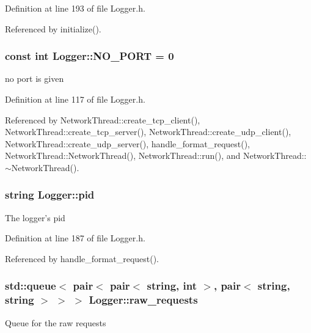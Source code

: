 Definition at line 193 of file Logger.h.



Referenced by initialize().

\hypertarget{classLogger_a5ec2e368c2190d33a096925d96309b32}{
\subsubsection[{NO\_\-PORT}]{\setlength{\rightskip}{0pt plus 5cm}const int {\bf Logger::NO\_\-PORT} = 0}}
\label{classLogger_a5ec2e368c2190d33a096925d96309b32}
no port is given 

Definition at line 117 of file Logger.h.



Referenced by NetworkThread::create\_\-tcp\_\-client(), NetworkThread::create\_\-tcp\_\-server(), NetworkThread::create\_\-udp\_\-client(), NetworkThread::create\_\-udp\_\-server(), handle\_\-format\_\-request(), NetworkThread::NetworkThread(), NetworkThread::run(), and NetworkThread::$\sim$NetworkThread().

\hypertarget{classLogger_a0fe7f2c4dcb22ef87f07294f3db9d8cc}{
\subsubsection[{pid}]{\setlength{\rightskip}{0pt plus 5cm}string {\bf Logger::pid}}}
\label{classLogger_a0fe7f2c4dcb22ef87f07294f3db9d8cc}
The logger's pid 

Definition at line 187 of file Logger.h.



Referenced by handle\_\-format\_\-request().

\hypertarget{classLogger_aeef2780f8f49da507fb3c954a1cdae29}{
\subsubsection[{raw\_\-requests}]{\setlength{\rightskip}{0pt plus 5cm}std::queue$<$ pair$<$ pair$<$ string, int $>$, pair$<$ string, string $>$ $>$ $>$ {\bf Logger::raw\_\-requests}}}
\label{classLogger_aeef2780f8f49da507fb3c954a1cdae29}
Queue for the raw requests 

